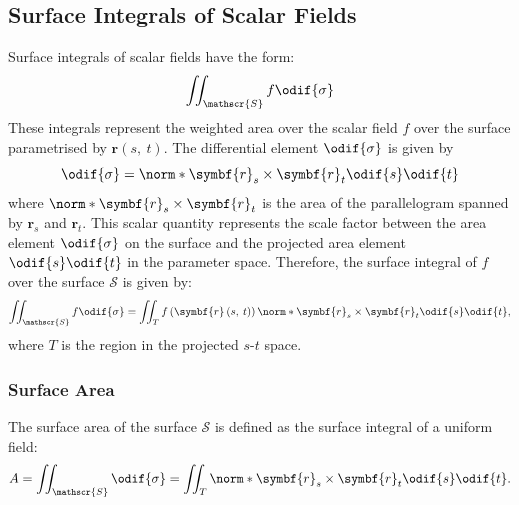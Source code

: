 \documentclass{article}
\begin{document}
\subsection{Surface Integrals of Scalar Fields}
Surface integrals of scalar fields have the form:
\begin{equation*}
    \iint_{\mathscr{S}} f \odif{\sigma}
\end{equation*}
These integrals represent the weighted area over the scalar field \(f\)
over the surface parametrised by \(\symbf{r}\left( s,\: t \right)\).
The differential element \(\odif{\sigma}\) is given by
\begin{equation*}
    \odif{\sigma} = \norm*{\symbf{r}_s \times \symbf{r}_t} \odif{s} \odif{t}
\end{equation*}
where \(\norm*{\symbf{r}_s \times \symbf{r}_t}\) is the area of
the parallelogram spanned by \(\symbf{r}_s\) and \(\symbf{r}_t\). This
scalar quantity represents the scale factor between the area element
\(\odif{\sigma}\) on the surface and the projected area element
\(\odif{s} \odif{t}\) in the parameter space. Therefore, the surface
integral of \(f\) over the surface \(\mathscr{S}\) is given by:
\begin{equation*}
    \iint_{\mathscr{S}} f \odif{\sigma} = \iint_T f\left( \symbf{r}\left( s,\: t \right) \right) \norm*{\symbf{r}_s \times \symbf{r}_t} \odif{s} \odif{t},
\end{equation*}
where \(T\) is the region in the projected \(s\)-\(t\) space.
\subsubsection{Surface Area}
The surface area of the surface \(\mathscr{S}\) is defined as the
surface integral of a uniform field:
\begin{equation*}
    A = \iint_{\mathscr{S}} \odif{\sigma} = \iint_T \norm*{\symbf{r}_s \times \symbf{r}_t} \odif{s} \odif{t}.
\end{equation*}
\end{document}
